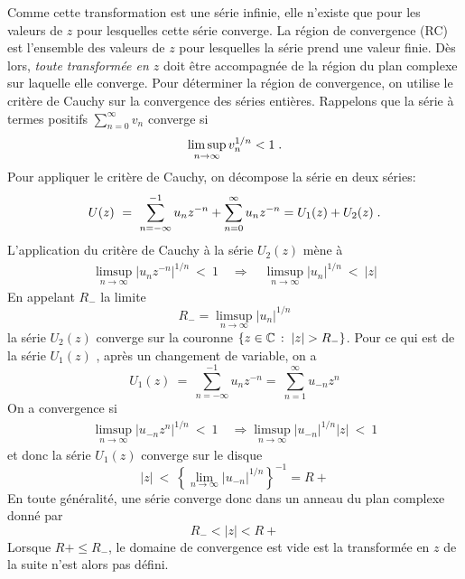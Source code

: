 Comme cette transformation est une s\'{e}rie infinie, elle n'existe que pour les valeurs de $z$ pour lesquelles cette s\'{e}rie converge. La r\'{e}gion de convergence (RC) est l'ensemble des valeurs de $z$ pour lesquelles la s\'{e}rie prend une valeur finie. Dès lors, \emph{toute transform\'{e}e en $z$} doit \^{e}tre accompagnée de la région du plan complexe sur laquelle elle converge. Pour d\'{e}terminer la r\'{e}gion de convergence, on utilise le crit\`{e}re de Cauchy sur la convergence des s\'{e}ries entières. Rappelons que la s\'{e}rie à termes positifs  
$ \sum_{n=0}^{\infty} v_n$ converge si
\begin{equation}
\label{eq:critere-cauchy}
\limsup_{n\rightarrow\infty} v_{n}^{1/n}<1 \;.
\end{equation}
Pour appliquer le crit\`{e}re de Cauchy, on d\'{e}compose la s\'{e}rie en deux s\'{e}ries:
$$
U(z)\ =\ \sum_{n=-\infty}^{-1} u_n z^{-n}+\sum_{n=0}^{\infty} u_n z^{-n} = U_1(z) + U_2(z) \;.
$$
L'application du crit\`{e}re de Cauchy \`{a} la s\'{e}rie $U_{2}(z)$ m\`{e}ne \`{a}
\begin{align*}
\limsup_{n\rightarrow\infty}| u_n z^{-n}|^{1/n}\ <\ 1  \quad \Rightarrow \quad
\limsup_{n\rightarrow\infty}| u_n |^{1/n}\ <\ |z|
\end{align*}
En appelant $R_{-}$ la limite
\begin{equation}
\label{eq:definition-R-}
R_{-}=\limsup_{n\rightarrow\infty}|u_n|^{1/n}
\end{equation}
la s\'{e}rie $U_{2}(z)$ converge sur la couronne $\ensemble{z \in \cset}{|z|>R_{-}}$.
Pour ce qui est de la s\'{e}rie $U_{1}(z)$ , apr\`{e}s un changement de variable, on a
$$
U_{1}(z)\ =\ \sum_{n=-\infty}^{-1} u_n z^{-n} =\ \sum_{n=1}^{\infty} u_{-n} z^{n}
$$
On a convergence si
\begin{align*}
\limsup_{n\rightarrow\infty}|u_{-n} z^{n}|^{1/n}\ <\ 1 \quad \Rightarrow \limsup_{n\rightarrow\infty}|u_{-n}|^{1/n}|z|\ <\ 1
\end{align*}
et donc la série $U_1(z)$ converge sur le disque 
\begin{equation}
\label{eq:definition-R+}
|z|\ <\ \left\{ \lim_{n\rightarrow\infty}|u_{-n}|^{1/n} \right\}^{-1}=R+
\end{equation}
En toute g\'{e}n\'{e}ralit\'{e}, une s\'{e}rie converge donc  dans un anneau du plan complexe  donn\'{e} par
$$
R_{-}<|z|<R+
$$
Lorsque $R+\leq R_{-}$, le domaine de convergence est vide est la transformée en $z$ de la suite n'est alors pas défini.

